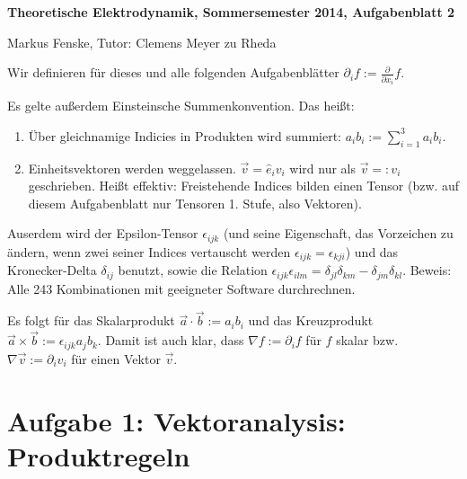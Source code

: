 \documentclass[a4paper,german,12pt,smallheadings]{scrartcl}
\begin{document}
\allowdisplaybreaks %
\begin{center}
\bfseries %
\sffamily %
\vspace{-40pt}
Theoretische Elektrodynamik, Sommersemester 2014, Aufgabenblatt 2

Markus Fenske, Tutor: Clemens Meyer zu Rheda
\vspace{-10pt}
\end{center}

Wir definieren für dieses und alle folgenden Aufgabenblätter $\partial_i f :=
\frac{\partial}{\partial x_i} f$.

Es gelte außerdem Einsteinsche Summenkonvention. Das heißt:

\begin{enumerate}
  \item
    Über gleichnamige Indicies in Produkten wird summiert: $a_ib_i := \sum_{i=1}^3 a_ib_i$.
  \item
    Einheitsvektoren werden weggelassen. $\vec{v} = \hat{e}_iv_i$ wird nur als
    $\vec{v} =: v_i$ geschrieben. Heißt effektiv: Freistehende Indices bilden einen Tensor
    (bzw. auf diesem Aufgabenblatt nur Tensoren 1. Stufe, also Vektoren).
\end{enumerate}

Auserdem wird der Epsilon-Tensor $\epsilon_{ijk}$ (und seine Eigenschaft, das
Vorzeichen zu ändern, wenn zwei seiner Indices vertauscht werden
$\epsilon_{ijk} = \epsilon_{kji}$) und das Kronecker-Delta
$\delta_{ij}$ benutzt, sowie die Relation $\epsilon_{ijk} \epsilon_{ilm} =
\delta_{jl}\delta_{km} - \delta_{jm}\delta_{kl}$. Beweis: Alle 243
Kombinationen mit geeigneter Software durchrechnen.

Es folgt für das Skalarprodukt $\vec{a} \cdot \vec{b} := a_ib_i$ und das
Kreuzprodukt $\vec{a} \times \vec{b} := \epsilon_{ijk} a_j b_k$.  Damit ist auch
klar, dass $\nabla f := \partial_i f$ für $f$ skalar bzw. $\nabla \vec{v} :=
\partial_i v_i$ für einen Vektor $\vec{v}$.

\section*{Aufgabe 1: Vektoranalysis: Produktregeln}
\end{document}
